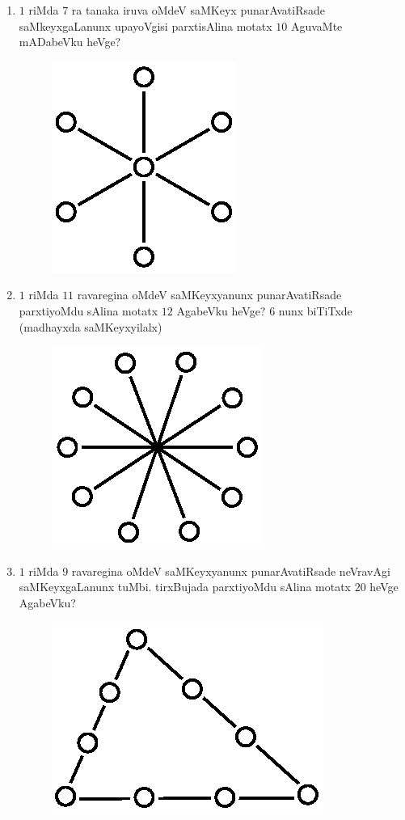 \begin{enumerate}
\eject

\item $1$ riMda $7$ ra tanaka iruva oMdeV saMKeyx punarAvatiRsade saMkeyxgaLanunx upayoVgisi parxtisAlina motatx $10$ AguvaMte mADabeVku heVge?
\begin{figure}[H]
\centering
\includegraphics{src/figures/exr19.eps}
\end{figure}

\item $1$ riMda $11$ ravaregina oMdeV saMKeyxyanunx punarAvatiRsade parxtiyoMdu sAlina motatx $12$ AgabeVku heVge? $6$ nunx biTiTxde (madhayxda saMKeyxyilalx)
\begin{figure}[H]
\centering
\includegraphics{src/figures/exr20.eps}
\end{figure}

\item $1$ riMda $9$ ravaregina oMdeV saMKeyxyanunx punarAvatiRsade neVravAgi saMKeyxgaLanunx tuMbi. tirxBujada parxtiyoMdu sAlina motatx $20$ heVge AgabeVku?
\begin{figure}[H]
\centering
\includegraphics{src/figures/exr21.eps}
\end{figure}


\end{enumerate}
